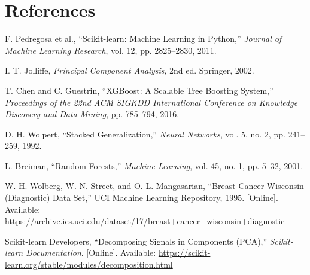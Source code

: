 \documentclass[11pt,a4paper]{article}
\begin{document}
\section{References}
\begin{enumerate}[label={[\arabic*]}]
\item F. Pedregosa et al., ``Scikit-learn: Machine Learning in Python,'' \emph{Journal of Machine Learning Research}, vol. 12, pp. 2825--2830, 2011.
\item I. T. Jolliffe, \emph{Principal Component Analysis}, 2nd ed. Springer, 2002.
\item T. Chen and C. Guestrin, ``XGBoost: A Scalable Tree Boosting System,'' \emph{Proceedings of the 22nd ACM SIGKDD International Conference on Knowledge Discovery and Data Mining}, pp. 785--794, 2016.
\item D. H. Wolpert, ``Stacked Generalization,'' \emph{Neural Networks}, vol. 5, no. 2, pp. 241--259, 1992.
\item L. Breiman, ``Random Forests,'' \emph{Machine Learning}, vol. 45, no. 1, pp. 5--32, 2001.
\item W. H. Wolberg, W. N. Street, and O. L. Mangasarian, ``Breast Cancer Wisconsin (Diagnostic) Data Set,'' UCI Machine Learning Repository, 1995. [Online]. Available: \url{https://archive.ics.uci.edu/dataset/17/breast+cancer+wisconsin+diagnostic}
\item Scikit-learn Developers, ``Decomposing Signals in Components (PCA),'' \emph{Scikit-learn Documentation}. [Online]. Available: \url{https://scikit-learn.org/stable/modules/decomposition.html}
\end{enumerate}
\end{document}

